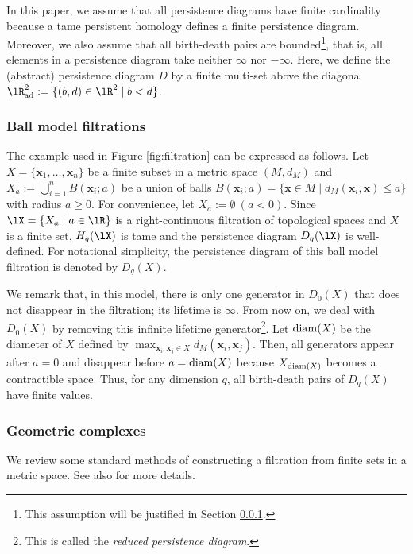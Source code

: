 \documentclass{article}
\newcommand{\diam}{{\rm diam}}
\begin{document}
In this paper, we assume that all persistence diagrams have finite cardinality because a tame persistent homology defines a finite persistence diagram.
Moreover, we also assume that all birth-death pairs are bounded\footnote{This assumption will be justified in Section \ref{subsec:geometrical}.}, that is, all elements in a persistence diagram take neither $\infty$ nor $-\infty$.
Here, we define the (abstract) persistence diagram $D$ by a finite multi-set above the diagonal $\lR^{2}_{{\rm ad}}:=\{(b,d) \in \lR^{2} \mid b < d\}$.

\subsubsection{Ball model filtrations}
\label{subsec:geometrical}

The example used in Figure \ref{fig:filtration} can be expressed as follows.
Let $X = \{\bm{x}_1, \ldots, \bm{x}_n \}$ be a finite subset in a metric space $(M,d_{M})$ and $X_{a}:=\bigcup_{i=1}^{n} B(\bm{x}_{i};a)$ be a union of balls $B(\bm{x}_i;a)=\{ \bm{x} \in M \mid d_{M}(\bm{x}_i,\bm{x}) \leq a\}$ with radius $a \geq 0$.
For convenience, let $X_{a}:=\emptyset \ (a < 0)$.
Since $\lX=\{X_{a} \mid a \in \lR \}$ is a right-continuous filtration of topological spaces and $X$ is a finite set, $H_{q}(\lX)$ is tame and the persistence diagram $D_{q}(\lX)$ is well-defined.
For notational simplicity, the persistence diagram of this ball model filtration is denoted by $D_q(X)$.

We remark that, in this model, there is only one generator in $D_0(X)$ that does not disappear in the filtration; its lifetime is $\infty$.
From now on, we deal with $D_0(X)$ by removing this infinite lifetime generator\footnote{This is called the {\em reduced persistence diagram}.}.
Let $\diam(X)$ be the diameter of $X$ defined by $\max_{\bm{x}_{i},\bm{x}_{j} \in X} d_{M}(\bm{x}_{i},\bm{x}_{j})$.
Then, all generators appear after $a=0$ and disappear before $a=\diam(X)$ because $X_{\diam(X)}$ becomes a contractible space.
Thus, for any dimension $q$, all birth-death pairs of $D_{q}(X)$ have finite values.


\subsubsection{Geometric complexes}

We review some standard methods of constructing a filtration from finite sets in a metric space. See also \cite{CdSO14} for more details.
\end{document}
